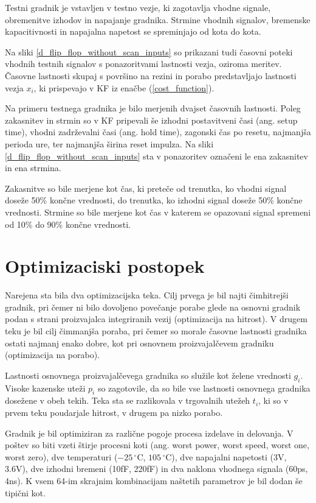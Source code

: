 \documentclass[journal,a4paper,twoside]{sty/IEEEtran}
\begin{document}
Testni gradnik je vstavljen v testno vezje, ki zagotavlja vhodne signale, obremenitve izhodov in napajanje gradnika. Strmine vhodnih signalov, bremenske kapacitivnosti in napajalna napetost se spreminjajo od kota do kota. 

Na sliki \ref{d_flip_flop_without_scan_inputs} so prikazani tudi časovni poteki vhodnih testnih signalov s ponazoritvami lastnosti vezja, oziroma meritev. Časovne lastnosti skupaj s površino na rezini in porabo predstavljajo lastnosti vezja $x_i$, ki prispevajo v KF iz enačbe (\ref{cost_function}).

Na primeru testnega gradnika je bilo merjenih dvajset časovnih lastnosti. Poleg zakasnitev in strmin so v KF pripevali še izhodni postavitveni časi (ang. setup time), vhodni zadrževalni časi (ang. hold time), zagonski čas po resetu, najmanjša perioda ure, ter najmanjša širina reset impulza. Na sliki \ref{d_flip_flop_without_scan_inputs} sta v ponazoritev označeni le ena zakasnitev in ena strmina.

Zakasnitve so bile merjene kot čas, ki preteče od trenutka, ko vhodni signal doseže 50\% končne vrednosti, do trenutka, ko izhodni signal doseže 50\% končne vrednosti. Strmine so bile merjene kot čas v katerem se opazovani signal spremeni od 10\% do 90\% končne vrednosti.

\section{Optimizaciski postopek}
Narejena sta bila dva optimizacijska teka. Cilj prvega je bil najti čimhitrejši gradnik, pri čemer ni bilo dovoljeno povečanje porabe glede na osnovni gradnik podan s strani proizvajalca integriranih vezij (optimizacija na hitrost). V drugem teku je bil cilj čimmanjša poraba, pri čemer so morale časovne lastnosti gradnika ostati najmanj enako dobre, kot pri osnovnem proizvajalčevem gradniku (optimizacija na porabo).

Lastnosti osnovnega proizvajalčevega gradnika so služile kot želene vrednosti $g_i$. Visoke kazenske uteži $p_i$ so zagotovile, da so bile vse lastnosti osnovnega gradnika dosežene v obeh tekih. Teka sta se razlikovala v trgovalnih utežeh $t_i$, ki so v prvem teku poudarjale hitrost, v drugem pa nizko porabo.

Gradnik je bil optimiziran za različne pogoje procesa izdelave in delovanja. V poštev so biti vzeti štirje procesni koti (ang. worst power, worst speed, worst one, worst zero), dve temperaturi ($-25\,^{\circ}\mathrm{C}$, $105\,^{\circ}\mathrm{C}$), dve napajalni napetosti (3V, 3.6V), dve izhodni bremeni (10fF, 220fF) in dva naklona vhodnega signala (60ps, 4ns). K vsem 64-im skrajnim kombinacijam naštetih parametrov je bil dodan še tipični kot.
\end{document}
